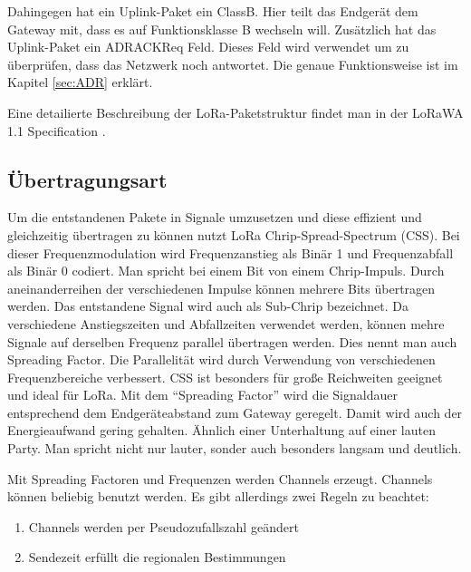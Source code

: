 \documentclass[a4paper, 12pt]{article}
\begin{document}
                Dahingegen hat ein Uplink-Paket ein ClassB. Hier teilt das Endgerät dem Gateway mit, dass es auf 
                Funktionsklasse B wechseln will. Zusätzlich hat das Uplink-Paket ein ADRACKReq Feld. Dieses Feld 
                wird verwendet um zu überprüfen, dass das Netzwerk noch antwortet. 
                Die genaue Funktionsweise ist im Kapitel \ref{sec:ADR}  erklärt.

                Eine detailierte Beschreibung der LoRa-Paketstruktur findet man in der LoRaWA 1.1 Specification \cite{LoRaSpec}.   
                
                
        \subsection{Übertragungsart}\label{sec:Modulation}
            Um die entstandenen Pakete in Signale umzusetzen und diese effizient und gleichzeitig übertragen zu können
            nutzt LoRa Chrip-Spread-Spectrum (CSS). Bei dieser Frequenzmodulation wird Frequenzanstieg als Binär 1 und 
            Frequenzabfall als Binär 0 codiert. Man spricht bei einem Bit von einem Chrip-Impuls. Durch 
            aneinanderreihen der verschiedenen Impulse können mehrere Bits übertragen werden. Das entstandene Signal 
            wird auch als Sub-Chrip bezeichnet. Da verschiedene Anstiegszeiten und Abfallzeiten verwendet werden, können  
            mehre Signale auf derselben Frequenz parallel übertragen werden. Dies nennt man auch Spreading Factor. 
            Die Parallelität wird durch Verwendung von verschiedenen Frequenzbereiche verbessert. 
            CSS ist besonders für große Reichweiten geeignet und ideal für LoRa. 
            Mit dem ``Spreading Factor'' wird die Signaldauer entsprechend dem Endgeräteabstand zum Gateway geregelt.
            Damit wird auch der Energieaufwand gering gehalten. Ähnlich einer Unterhaltung auf einer lauten Party. 
            Man spricht nicht nur lauter, sonder auch besonders langsam und deutlich.\cite{explain}

            Mit Spreading Factoren und Frequenzen werden Channels erzeugt. Channels können 
            beliebig benutzt werden. Es gibt allerdings zwei Regeln zu beachtet: 
            \begin{enumerate}   
                \item Channels werden per Pseudozufallszahl geändert
                \item Sendezeit erfüllt die regionalen Bestimmungen
            \end{enumerate}
            
\end{document}
